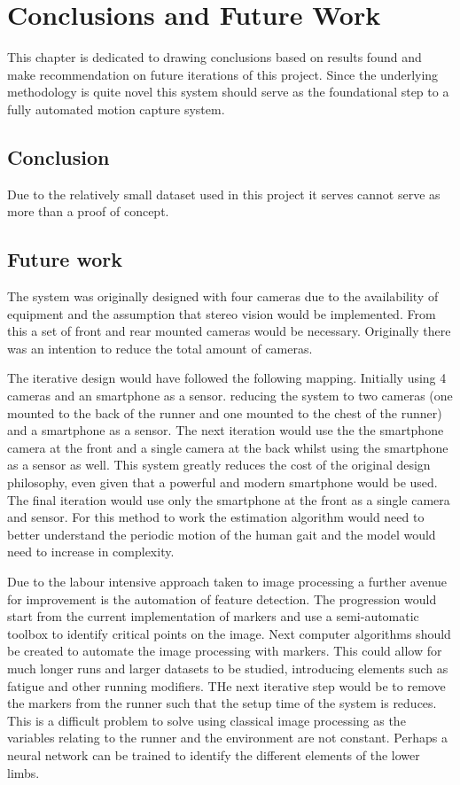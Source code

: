 \chapter{Conclusions and Future Work}
This chapter is dedicated to drawing conclusions based on results found and make recommendation on future iterations of this project. Since the underlying methodology is quite novel this system should serve as the foundational step to a fully automated motion capture system.

\section{Conclusion}
Due to the relatively small dataset used in this project it serves cannot serve  as more than a proof of concept.

\section{Future work}
The system was originally designed with four cameras due to the availability of equipment and the assumption that stereo vision would be implemented. From this a set of front and rear mounted cameras would be necessary. Originally there was an intention to reduce the total amount of cameras.

The iterative design would have followed the following mapping. Initially using 4 cameras and an smartphone as a sensor. reducing the system to two cameras (one mounted to the back of the runner and one mounted to the chest of the runner) and a smartphone as a sensor. The next iteration would use the the smartphone camera at the front and a single camera at the back whilst using the smartphone as a sensor as well. This system greatly reduces the cost of the original design philosophy, even given that a powerful and modern smartphone would be used. The final iteration would use only the smartphone at the front as a single camera and sensor. For this method to work the estimation algorithm would need to better understand the periodic motion of the human gait and the model would need to increase in complexity.

Due to the labour intensive approach taken to image processing a further avenue for improvement is the automation of feature detection. The progression would start from the current implementation of markers and use a semi-automatic toolbox to identify critical points on the image. Next computer algorithms should be created to automate the image processing with markers. This could allow for much longer runs and larger datasets to be studied, introducing elements such as fatigue and other running modifiers. THe next iterative step would be to remove the markers from the runner such that the setup time of the system is reduces. This is a difficult problem to solve using classical image processing as the variables relating to the runner and the environment are not constant. Perhaps a neural network can be trained to identify the different elements of the lower limbs.

